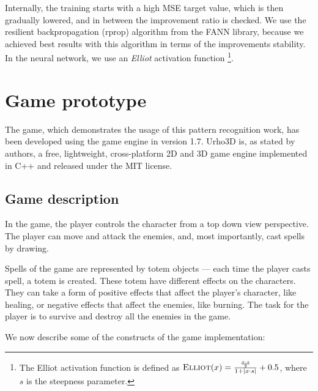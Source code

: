 Internally, the training starts with a high MSE target value, which is then gradually lowered, and in between the improvement ratio is checked. We use the resilient backpropagation (rprop) algorithm from the FANN library, because we achieved best results with this algorithm in terms of the improvements stability. In the neural network, we use an \emph{Elliot} activation function \footnote{The Elliot activation function is defined as $\textsc{Elliot}(x) = \frac {\frac{x\cdot s}{2}} {1+\left|{x\cdot s}\right|}+ 0.5$, where $s$ is the steepness parameter.}.

\section{Game prototype}
The game, which demonstrates the usage of this pattern recognition work, has been developed using the \citet{urho} game engine in version 1.7. Urho3D is, as stated by authors, a free, lightweight, cross-platform 2D and 3D game engine implemented in C++ and released under the MIT license.

\subsection{Game description}
In the game, the player controls the character from a top down view perspective. The player can move and attack the enemies, and, most importantly, cast spells by drawing.

Spells of the game are represented by totem objects --- each time the player casts spell, a totem is created. These totem have different effects on the characters. They can take a form of positive effects that affect the player's character, like healing, or negative effects that affect the enemies, like burning. The task for the player is to survive and destroy all the enemies in the game.

We now describe some of the constructs of the game implementation:

